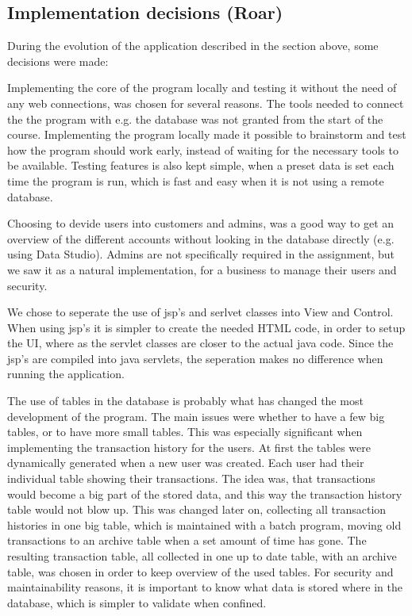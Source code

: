 \subsection{Implementation decisions (Roar)}

During the evolution of the application described in the section above, some decisions were made:

Implementing the core of the program locally and testing it without the need of any web connections, was chosen for several reasons. The tools needed to connect the the program with e.g. the database was not granted from the start of the course. Implementing the program locally made it possible to brainstorm and test how the program should work early, instead of waiting for the necessary tools to be available. Testing features is also kept simple, when a preset data is set each time the program is run, which is fast and easy when it is not using a remote database. 

Choosing to devide users into customers and admins, was a good way to get an overview of the different accounts without looking in the database directly (e.g. using Data Studio). Admins are not specifically required in the assignment, but we saw it as a natural implementation, for a business to manage their users and security. 

We chose to seperate the use of jsp's and serlvet classes into View and Control. When using jsp's it is simpler to create the needed HTML code, in order to setup the UI, where as the servlet classes are closer to the actual java code. Since the jsp's are compiled into java servlets, the seperation makes no difference when running the application. 

The use of tables in the database is probably what has changed the most development of the program. The main issues were whether to have a few big tables, or to have more small tables. This was especially significant when implementing the transaction history for the users. At first the tables were dynamically generated when a new user was created. Each user had their individual table showing their transactions. The idea was, that transactions would become a big part of the stored data, and this way the transaction history table would not blow up. This was changed later on, collecting all transaction histories in one big table, which is maintained with a batch program, moving old transactions to an archive table when a set amount of time has gone. The resulting transaction table, all collected in one up to date table, with an archive table, was chosen in order to keep overview of the used tables. For security and maintainability reasons, it is important to know what data is stored where in the database, which is simpler to validate when confined.

